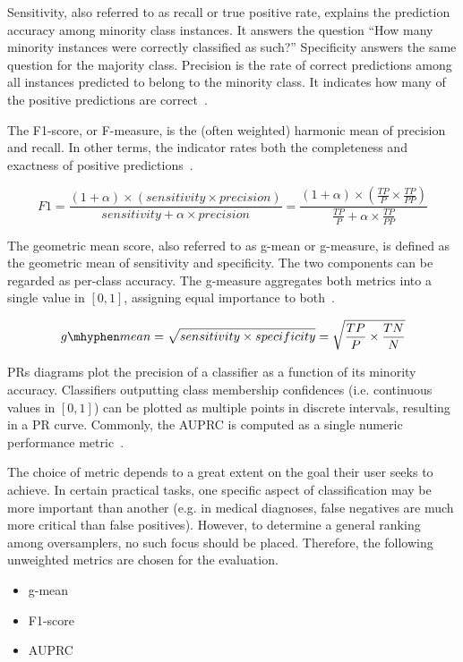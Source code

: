 \documentclass[sort&compress]{elsarticle}
\begin{document}
	 Sensitivity, also referred to as recall or true positive rate, explains the
	 prediction accuracy among minority class instances. It answers the question
	 ``How many minority instances were correctly classified as such?''
	 Specificity answers the same question for the majority class. Precision is
	 the rate of correct predictions among all instances predicted to belong to
	 the minority class. It indicates how many of the positive predictions are
	 correct~\citep{He.2009}.

	 The F1-score, or F-measure, is the (often weighted) harmonic mean of
	 precision and recall. In other terms, the indicator rates both the
	 completeness and exactness of positive
	 predictions~\citep{He.2009,Japkowicz.2013}.
	 
	\begin{equation}
	F1 = \frac{(1 + \alpha) \times (sensitivity \times precision)}{sensitivity + \alpha \times precision} 
	= \frac{(1 + \alpha) \times (\frac{TP}{P} \times \frac{TP}{PP})}{\frac{TP}{P} + \alpha \times \frac{TP}{PP} }
	\end{equation}

	The geometric mean score, also referred to as g-mean or g-measure, is
	defined as the geometric mean of sensitivity and specificity. The two
	components can be regarded as per-class accuracy. The g-measure aggregates
	both metrics into a single value in $[0,1]$, assigning equal importance to
	both~\citep{He.2009,Japkowicz.2013}.
	
	\begin{equation}
	g\mhyphen mean = \sqrt{sensitivity \times specificity} 
	= \sqrt{\frac{TP}{P} \times \frac{TN}{N}}
	\end{equation}

	\acp{PR} diagrams plot the precision of a classifier as a function of its
	minority accuracy. Classifiers outputting class membership confidences (i.e.
	continuous values in $[0,1]$) can be plotted as multiple points in discrete
	intervals, resulting in a \ac{PR} curve. Commonly, the \ac{AUPRC} is
	computed as a single numeric performance
	metric~\citep{He.2009,Japkowicz.2013}.
	
	The choice of metric depends to a great extent on the goal their user seeks
	to achieve. In certain practical tasks, one specific aspect of
	classification may be more important than another (e.g. in medical
	diagnoses, false negatives are much more critical than false positives).
	However, to determine a general ranking among oversamplers, no such focus
	should be placed. Therefore, the following unweighted metrics are chosen for
	the evaluation.
    \begin{itemize}
    	\item g-mean
        \item F1-score
		\item \ac{AUPRC}
	\end{itemize}
   
\end{document}
